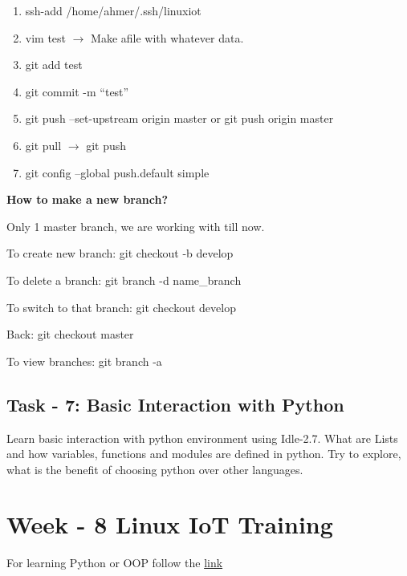 \documentclass[letterpaper,10pt,english]{sphinxmanual}
\begin{document}
\begin{enumerate}
\item {} 
ssh-add /home/ahmer/.ssh/linuxiot

\item {} 
vim test        \(\rightarrow\) Make afile with whatever data.

\item {} 
git add test

\item {} 
git commit -m “test”

\item {} 
git push –set-upstream origin master            or      git push origin master

\item {} 
git pull \(\rightarrow\)  git push

\item {} 
git config –global push.default simple

\end{enumerate}

\textbf{How to make a new branch?}

Only 1 master branch, we are working with till now.

To create new branch:   git checkout -b develop

To delete a branch:             git branch -d name\_branch

To switch to that branch:       git checkout develop

Back:                           git checkout master

To view branches:               git branch -a


\section{Task - 7: Basic Interaction with Python}
\label{week-07:task-7-basic-interaction-with-python}
Learn basic interaction with python environment using Idle-2.7. What are Lists and how variables, functions and modules are defined in python. Try to explore, what is the benefit of choosing python over other languages.


\chapter{Week - 8 Linux IoT Training}
\label{week-08::doc}\label{week-08:week-8-linux-iot-training}\label{week-08:week-08}
For learning Python or OOP follow the \href{http://www.tutorialspoint.com/python/python\_classes\_objects.htm}{link}
\end{document}
